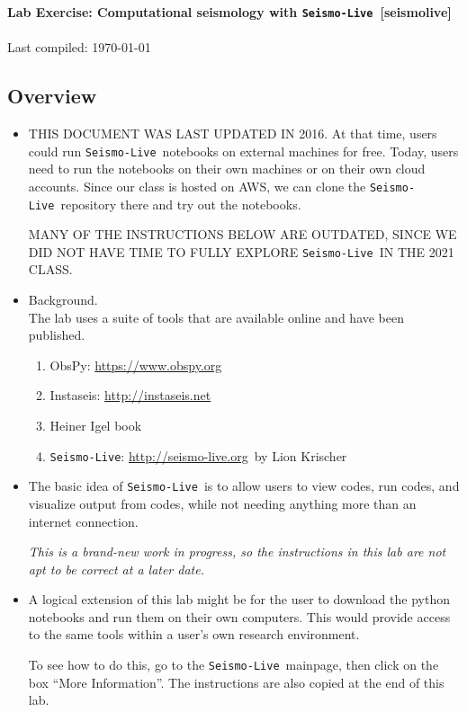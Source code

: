 \documentclass[11pt,titlepage,fleqn]{article}
\newcommand{\slive}{{\tt Seismo-Live}}
\newcommand{\sliveurl}{\url{http://seismo-live.org}}
\begin{document}

\begin{spacing}{1.2}
\centering
{\large \bf Lab Exercise: Computational seismology with \slive\ [seismolive]} \\
\cltag\ \\
Last compiled: \today
\end{spacing}


\subsection*{Overview}

\begin{itemize}
\item THIS DOCUMENT WAS LAST UPDATED IN 2016. At that time, users could run \slive\ notebooks on external machines for free. Today, users need to run the notebooks on their own machines or on their own cloud accounts. Since our class is hosted on AWS, we can clone the \slive\ repository there and try out the notebooks.

MANY OF THE INSTRUCTIONS BELOW ARE OUTDATED, SINCE WE DID NOT HAVE TIME TO FULLY EXPLORE \slive\ IN THE 2021 CLASS.

\item Background. \\
The lab uses a suite of tools that are available online and have been published.
\begin{enumerate}
\item ObsPy: \url{https://www.obspy.org} \\
\citet{obspy2010,obspy2011,obspy2015}
\item Instaseis: \url{http://instaseis.net} \\
\citet{instaseis}
\item Heiner Igel book \citep{igel}
\item \slive: \sliveurl\ by Lion Krischer
\end{enumerate}

\item The basic idea of \slive\ is to allow users to view codes, run codes, and visualize output from codes, while not needing anything more than an internet connection.

{\em This is a brand-new work in progress, so the instructions in this lab are not apt to be correct at a later date.}

\item A logical extension of this lab might be for the user to download the python notebooks and run them on their own computers. This would provide access to the same tools within a user's own research environment.

To see how to do this, go to the \slive\ mainpage, then click on the box ``More Information''. The instructions are also copied at the end of this lab.

\end{itemize}
\end{document}
